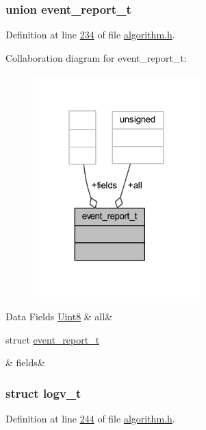\subsubsection{union event\+\_\+report\+\_\+t}


Definition at line \hyperlink{a00021_source_l00234}{234} of file \hyperlink{a00021_source}{algorithm.\+h}.



Collaboration diagram for event\+\_\+report\+\_\+t\+:\nopagebreak
\begin{figure}[H]
\begin{center}
\leavevmode
\includegraphics[width=184pt]{df/d41/a00881}
\end{center}
\end{figure}
\begin{DoxyFields}{Data Fields}
\hypertarget{a00021_a2625a533c46821f49caaf4dcc77316b1}{\hyperlink{a00072_af84840501dec18061d18a68c162a8fa2}{Uint8}}\label{a00021_a2625a533c46821f49caaf4dcc77316b1}
&
all&
\\
\hline

\hypertarget{a00021_a5296d090c085b0421fdf5a86e382abea}{struct \hyperlink{a00021_db/d34/a00442}{event\+\_\+report\+\_\+t}}\label{a00021_a5296d090c085b0421fdf5a86e382abea}
&
fields&
\\
\hline

\end{DoxyFields}
\label{d6/da3/a00589}
\hypertarget{a00021_d6/da3/a00589}{}
\subsubsection{struct logv\+\_\+t}


Definition at line \hyperlink{a00021_source_l00244}{244} of file \hyperlink{a00021_source}{algorithm.\+h}.



